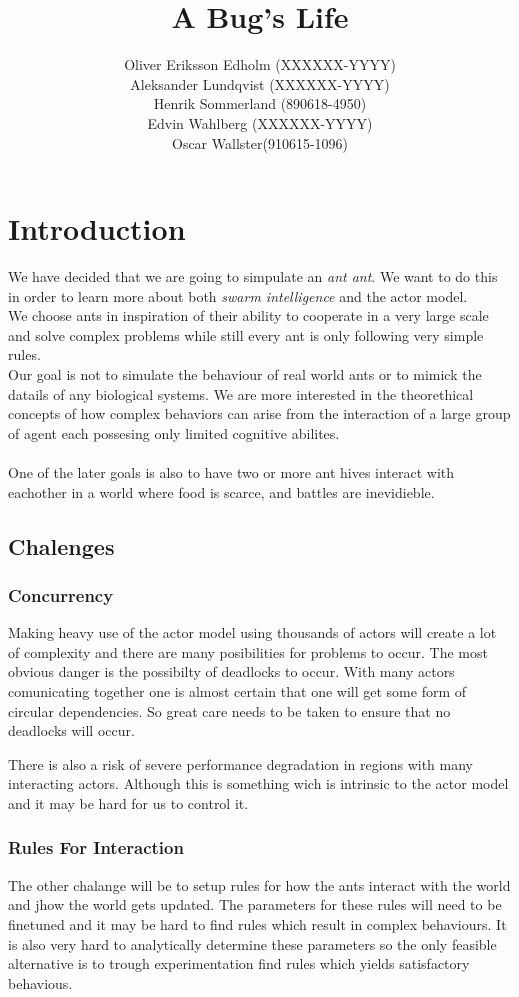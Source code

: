 \documentclass[a4paper]{article}
\title{A Bug's Life}
\author{Oliver Eriksson Edholm (XXXXXX-YYYY) \\
		Aleksander Lundqvist (XXXXXX-YYYY) \\
		Henrik Sommerland (890618-4950) \\
		Edvin Wahlberg (XXXXXX-YYYY) \\
		Oscar Wallster(910615-1096)}
\begin{document}
\maketitle

\section{Introduction}
We have decided that we are going to simpulate an \emph{ant ant}. We want to do this in order to learn
more about both \emph{swarm intelligence} and the actor model.\\
We choose ants in inspiration of their ability to cooperate in a very large scale and solve complex problems while still every ant is only following very simple rules. 
\\
Our goal is not to simulate the behaviour of real world ants or to mimick the datails of any biological systems.
We are more interested in the theorethical concepts of how complex behaviors can arise from the interaction of
a large group of agent each possesing only limited cognitive abilites.\\
\\
One of the later goals is also to have two or more ant hives interact with eachother in a world where food is scarce, and battles are inevidieble.

\subsection{Chalenges}
\subsubsection{Concurrency}
Making heavy use of the actor model using thousands of actors will create a lot of complexity and there are many posibilities for
problems to occur. The most obvious danger is the possibilty of deadlocks to occur. With many actors comunicating together one is
almost certain that one will get some form of circular dependencies. So great care needs to be taken to ensure that no deadlocks will occur.

There is also a risk of severe performance degradation in regions with many interacting actors. Although this is something wich is intrinsic to
the actor model and it may be hard for us to control it.
\subsubsection{Rules For Interaction}
The other chalange will be to setup rules for how the ants interact with the world and jhow the world gets updated. The parameters for these rules will need to be
finetuned and it may be hard to find rules which result in complex behaviours. It is also very hard to analytically determine these parameters so the only
feasible alternative is to trough experimentation find rules which yields satisfactory behavious.
\end{document}
